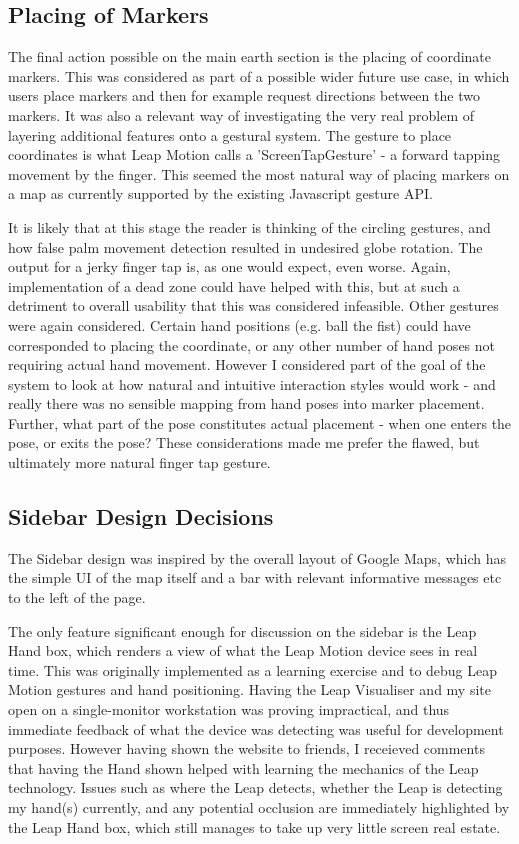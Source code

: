 \documentclass{sigplanconf}
\begin{document}
\subsection{Placing of Markers}

The final action possible on the main earth section is the placing of coordinate markers. This was considered as part of a possible wider future use case, in which users place markers and then for example request directions between the two markers. It was also a relevant way of investigating the very real problem of layering additional features onto a gestural system. The gesture to place coordinates is what Leap Motion calls a 'ScreenTapGesture' - a forward tapping movement by the finger. This seemed the most natural way of placing markers on a map as currently supported by the existing Javascript gesture API. 

It is likely that at this stage the reader is thinking of the circling gestures, and how false palm movement detection resulted in undesired globe rotation. The output for a jerky finger tap is, as one would expect, even worse. Again, implementation of a dead zone could have helped with this, but at such a detriment to overall usability that this was considered infeasible. Other gestures were again considered. Certain hand positions (e.g. ball the fist) could have corresponded to placing the coordinate, or any other number of hand poses not requiring actual hand movement. However I considered part of the goal of the system to look at how natural and intuitive interaction styles would work - and really there was no sensible mapping from hand poses into marker placement. Further, what part of the pose constitutes actual placement - when one enters the pose, or exits the pose? These considerations made me prefer the flawed, but ultimately more natural finger tap gesture.

\subsection{Sidebar Design Decisions}

The Sidebar design was inspired by the overall layout of Google Maps, which has the simple UI of the map itself and a bar with relevant informative messages etc to the left of the page. 

The only feature significant enough for discussion on the sidebar is the Leap Hand box, which renders a view of what the Leap Motion device sees in real time. This was originally implemented as a learning exercise and to debug Leap Motion gestures and hand positioning. Having the Leap Visualiser and my site open on a single-monitor workstation was proving impractical, and thus immediate feedback of what the device was detecting was useful for development purposes. However having shown the website to friends, I receieved comments that having the Hand shown helped with learning the mechanics of the Leap technology. Issues such as where the Leap detects, whether the Leap is detecting my hand(s) currently, and any potential occlusion are immediately highlighted by the Leap Hand box, which still manages to take up very little screen real estate. 
\end{document}
